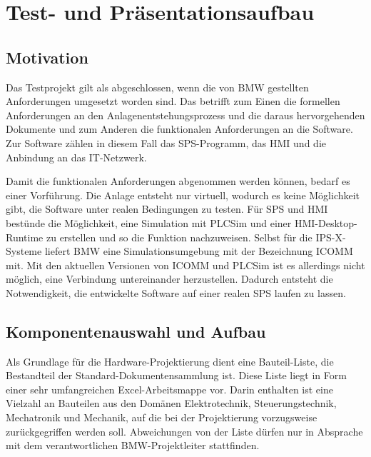 

\chapter{Test- und Präsentationsaufbau}

\section{Motivation}
\label{sec:testingRackMotivation}

Das Testprojekt gilt als abgeschlossen, wenn die von BMW gestellten Anforderungen umgesetzt worden sind. Das betrifft zum Einen die formellen Anforderungen an den Anlagenentstehungsprozess und die daraus hervorgehenden Dokumente und zum Anderen die funktionalen Anforderungen an die Software. Zur Software zählen in diesem Fall das SPS-Programm, das HMI und die Anbindung an das IT-Netzwerk. 

Damit die funktionalen Anforderungen abgenommen werden können, bedarf es einer Vorführung. Die Anlage entsteht nur virtuell, wodurch es keine Möglichkeit gibt, die Software unter realen Bedingungen zu testen. Für SPS und HMI bestünde die Möglichkeit, eine Simulation mit PLCSim und einer HMI-Desktop-Runtime zu erstellen und so die Funktion nachzuweisen. Selbst für die IPS-X-Systeme liefert BMW eine Simulationsumgebung mit der Bezeichnung ICOMM mit. Mit den aktuellen Versionen von ICOMM und PLCSim ist es allerdings nicht möglich, eine Verbindung untereinander herzustellen. Dadurch entsteht die Notwendigkeit, die entwickelte Software auf einer realen SPS laufen zu lassen.

\section{Komponentenauswahl und Aufbau}
\label{sec:componentsAndAssembly}

Als Grundlage für die Hardware-Projektierung dient eine Bauteil-Liste, die Bestandteil der Standard-Dokumentensammlung ist. Diese Liste liegt in Form einer sehr umfangreichen Excel-Arbeitsmappe vor. Darin enthalten ist eine Vielzahl an Bauteilen aus den Domänen Elektrotechnik, Steuerungstechnik, Mechatronik und Mechanik, auf die bei der Projektierung vorzugsweise zurückgegriffen werden soll. Abweichungen von der Liste dürfen nur in Absprache mit dem verantwortlichen BMW-Projektleiter stattfinden.

